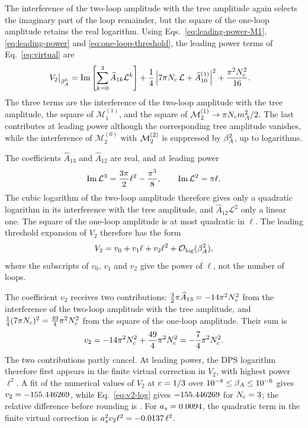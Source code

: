The interference of the two-loop amplitude with the tree amplitude again
selects the imaginary part of the loop remainder, but the square of the
one-loop amplitude retains the real logarithm. Using
Eqs.~\eqref{eq:leading-power-M1}, \eqref{eq:leading-power} and \eqref{eq:one-loop-threshold}, the leading
power terms of Eq.~\eqref{eq:virtual} are
\begin{align}
 V_2\big|_{\beta_A^0}
 &=
 \operatorname{Im}\left[
  \sum_{k=0}^{3}\widehat A_{1k}\mathcal L^k
 \right] +
 \frac14\left|
  7\pi N_c\,\mathcal L
  +\widehat A^{(1)}_{10}
 \right|^2
 +\frac{\pi^2N_c^2}{16}.
\end{align}
The three terms are the interference of the two-loop amplitude with the
tree amplitude, the square of $\mathcal M_1^{(1)}$, and the square of
$\mathcal M_2^{(1)}\to\pi N_cm_A^2/2$. The last contributes at leading power
although the corresponding tree amplitude vanishes, while the interference
of $\mathcal M_2^{(0)}$ with $\mathcal{M}^{(2)}_{2}$ is suppressed by $\beta_A^2$, up to
logarithms.

The coefficients $\widehat A_{13}$ and $\widehat A_{12}$ are real, and at
leading power
\[
 \operatorname{Im}\mathcal L^3
 =\frac{3\pi}{2}\ell^2-\frac{\pi^3}{8},
 \qquad
 \operatorname{Im}\mathcal L^2=\pi\ell.
\]
The cubic logarithm of the two-loop amplitude therefore gives only a
quadratic logarithm in its interference with the tree amplitude, and
$\widehat A_{12}\mathcal L^2$ only a linear one. The square of the one-loop
amplitude is at most quadratic in $\ell$. The leading threshold expansion
of $V_2$ therefore has the form
\begin{equation}
 V_2=v_0+v_1\ell+v_2\ell^2
     +\mathcal{O}_{\log}(\beta_A^2),
 \label{eq:v2-form}
\end{equation}
where the subscripts of $v_0$, $v_1$ and $v_2$ give the power of $\ell$,
not the number of loops.

The coefficient $v_2$ receives two contributions: $\tfrac32\pi\widehat
A_{13}=-14\pi^2N_c^2$ from the interference of the two-loop amplitude with
the tree amplitude, and $\tfrac14(7\pi N_c)^2=\tfrac{49}{4}\pi^2N_c^2$
from the square of the one-loop amplitude. Their sum is
\begin{equation}
 v_2
 =-14\pi^2N_c^2+\frac{49}{4}\pi^2N_c^2
 =-\frac74\pi^2N_c^2.
 \label{eq:v2-log}
\end{equation}
The two contributions partly cancel. At leading power, the DPS logarithm
therefore first appears in the finite virtual correction in $V_2$, with
highest power $\ell^2$.
%
A fit of the numerical values of $V_2$ at $c=1/3$ over
$10^{-8}\leq\beta_A\leq10^{-6}$ gives $v_2=-155.446269$, while
Eq.~\eqref{eq:v2-log} gives $-155.446269$ for $N_c=3$; the
relative difference before rounding is \VtwoLogRelDiff{}. For
$a_s=0.0094$, the quadratic term in the finite virtual correction is
$a_s^2v_2\ell^2=-0.0137\,\ell^2$.


